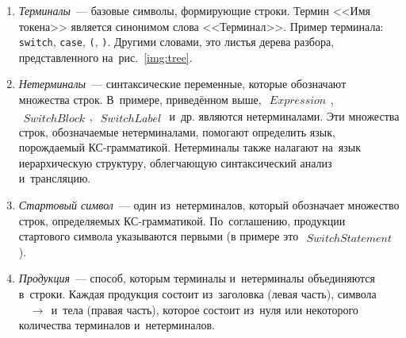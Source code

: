 \begin{enumerate} 
	\item{\textit{Терминалы}~--- базовые символы, формирующие строки. Термин <<Имя токена>> является синонимом слова <<Терминал>>. Пример терминала: \texttt{switch}, \texttt{case}, \texttt{(}, \texttt{)}}. Другими словами, это листья дерева разбора, представленного на~рис.~\ref{img:tree}.
	\item{\textit{Нетерминалы}~--- синтаксические переменные, которые обозначают множества строк. В~примере, приведённом выше, $\begin{aligned} Expression \end{aligned}$, $\begin{aligned} SwitchBlock \end{aligned}$, $\begin{aligned} SwitchLabel \end{aligned}$ и~др. являются нетерминалами. Эти множества строк, обозначаемые нетерминалами, помогают определить язык, порождаемый КС-грамматикой. Нетерминалы также налагают на~язык иерархическую структуру, облегчающую синтаксический анализ и~трансляцию.}
	\item{\textit{Стартовый символ}~--- один из~нетерминалов, который обозначает множество строк, определяемых КС-грамматикой. По~соглашению, продукции стартового символа указываются первыми (в примере это $\begin{aligned} SwitchStatement \end{aligned}$).}
	\item{\textit{Продукция}~--- способ, которым терминалы и~нетерминалы объединяются в~строки. Каждая продукция состоит из~заголовка (левая часть), символа $\begin{aligned} &\to \end{aligned}$ и~тела (правая часть), которое состоит из~нуля или некоторого количества терминалов и~нетерминалов.}
\end{enumerate}
